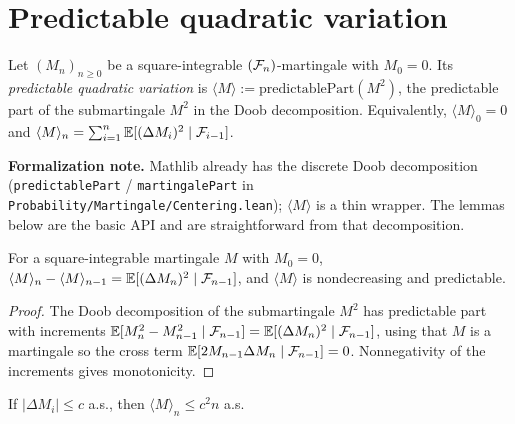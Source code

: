 \section{Predictable quadratic variation}
\label{sec:pre_qv}

\begin{definition}\label{def:pred_qv}
\leanok
Let $(M_n)_{n\ge0}$ be a square-integrable $(\mathcal{F}_n)$-martingale with $M_0 = 0$.
Its \emph{predictable quadratic variation} is
$\langle M\rangle := \mathrm{predictablePart}(M^2)$, the predictable part of the
submartingale $M^2$ in the Doob decomposition. Equivalently,
$\langle M\rangle_0 = 0$ and
$\langle M\rangle_n = \sum_{i=1}^n \mathbb{E}[(\Delta M_i)^2 \mid \mathcal{F}_{i-1}]$.
\end{definition}

\textbf{Formalization note.} Mathlib already has the discrete Doob decomposition
(\texttt{predictablePart} / \texttt{martingalePart} in
\texttt{Probability/Martingale/Centering.lean}); $\langle M\rangle$ is a thin
wrapper. The lemmas below are the basic API and are straightforward from that
decomposition.

\begin{lemma}\label{lem:qv_incr}
\leanok
{}
For a square-integrable martingale $M$ with $M_0=0$,
$\langle M\rangle_n - \langle M\rangle_{n-1} = \mathbb{E}[(\Delta M_n)^2\mid\mathcal{F}_{n-1}]$,
and $\langle M\rangle$ is nondecreasing and predictable.
\end{lemma}

\begin{proof}\leanok
The Doob decomposition of the submartingale $M^2$ has predictable part with
increments $\mathbb{E}[M_n^2 - M_{n-1}^2\mid\mathcal{F}_{n-1}]
= \mathbb{E}[(\Delta M_n)^2\mid\mathcal{F}_{n-1}]$, using that $M$ is a martingale so the cross
term $\mathbb{E}[2M_{n-1}\Delta M_n\mid\mathcal{F}_{n-1}]=0$. Nonnegativity of the increments
gives monotonicity.
\end{proof}

\begin{lemma}\label{lem:qv_linear_bound}
\leanok
{}
If $|\Delta M_i|\le c$ a.s., then $\langle M\rangle_n \le c^2 n$ a.s.
\end{lemma}

